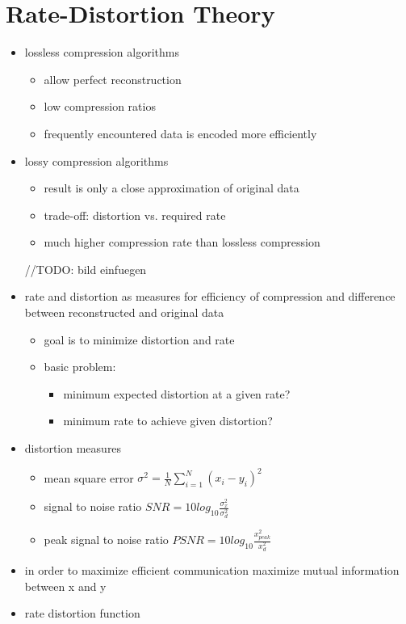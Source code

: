 \documentclass[a4paper,10pt]{scrreprt}
\begin{document}
\section{Rate-Distortion Theory}
\begin{itemize}
 \item lossless compression algorithms 
 \begin{itemize}
  \item allow perfect reconstruction 
  \item low compression ratios
  \item frequently encountered data is encoded more efficiently 
 \end{itemize}
 \item lossy compression algorithms
 \begin{itemize}
  \item result is only a close approximation of original data
  \item trade-off: distortion vs. required rate 
  \item much higher compression rate than lossless compression
 \end{itemize}
//TODO: bild einfuegen
 \item rate and distortion as measures for efficiency of compression and difference between reconstructed and original data 
 \begin{itemize}
  \item goal is to minimize distortion and rate 
  \item basic problem:
  \begin{itemize}
   \item minimum expected distortion at a given rate?
   \item minimum rate to achieve given distortion?  
  \end{itemize}
 \end{itemize}
 \item distortion measures
 \begin{itemize}
  \item mean square error $\sigma^2 = \frac{1}{N}\sum\limits_{i=1}^N(x_i - y_i)^2$
  \item signal to noise ratio $SNR = 10 log_{10}\frac{\sigma_x^2}{\sigma_d^2}$
  \item peak signal to noise ratio $PSNR = 10 log_{10}\frac{x_{peak}^2}{x_d^2}$
 \end{itemize}
 \item in order to maximize efficient communication maximize mutual information between x and y 
 \item rate distortion function 
\end{itemize}
\end{document}
